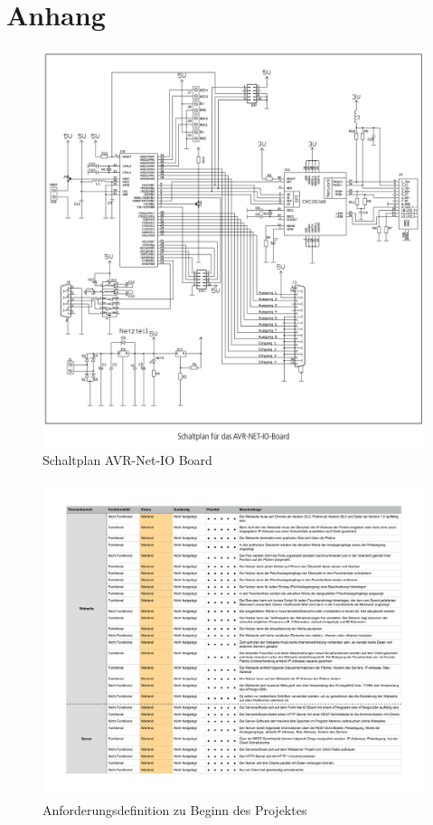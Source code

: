\chapter{Anhang}

\begin{figure}[htp]
  \includegraphics[width=14cm]{content/pictures/AVR-NET-IO_schaltplan.png}
  \caption{Schaltplan AVR-Net-IO Board}
  \label{anh:schaltplan}
\end{figure}

\newpage

\begin{figure}[htp]
  \includegraphics[width=16cm]{content/pictures/Anforderungen.pdf}
  \caption{Anforderungsdefinition zu Beginn des Projektes}
  \label{anh:schaltplan}
\end{figure}